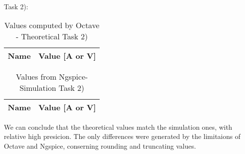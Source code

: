 Task 2):

\begin{table}[ht]
	\centering
	\begin{tabular}{|l|r|}
    		\hline    
    		{\bf Name} & {\bf Value [A or V]} \\ \hline
    		
  	\end{tabular}
  	\caption{Values computed by Octave - Theoretical Task 2)}
 
\label{tab:node}
\end{table}

\begin{table}[ht]
	\centering
	\begin{tabular}{|l|r|}
		\hline    
		{\bf Name} & {\bf Value [A or V]} \\ \hline
    		
	\end{tabular}
	
	\caption{Values from Ngspice- Simulation Task 2)}
    
\label{tab:op1}
\end{table}

We can conclude that the theoretical values match the simulation ones, with relative high presicion. The only
differences were generated by the limitaions of Octave and Ngspice, conserning rounding and truncating values.




